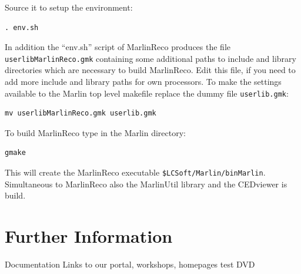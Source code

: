 Source it to setup the environment:

\begin{verbatim}
. env.sh 
\end{verbatim}

In addition the ``env.sh'' script of MarlinReco produces the file 
{\tt userlibMarlinReco.gmk} containing some additional paths 
to include and library directories which are necessary to build 
MarlinReco. Edit this file, if you need to add 
more include and library paths for own processors. To make the settings 
available to the Marlin top level makefile replace the dummy file 
{\tt userlib.gmk}:

\begin{verbatim}
mv userlibMarlinReco.gmk userlib.gmk
\end{verbatim}

To build MarlinReco type in the Marlin directory:

\begin{verbatim}
gmake
\end{verbatim}

This will create the MarlinReco executable {\tt \$LCSoft/Marlin/binMarlin}. 
Simultaneous to MarlinReco also the MarlinUtil library and the CEDviewer is 
build. 

\section{Further Information}
Documentation
Links to our portal, workshops, homepages
test DVD

